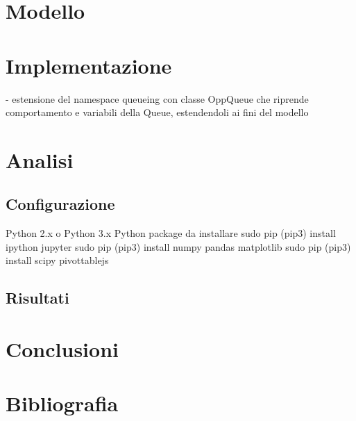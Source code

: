 \documentclass[a4paper,11pt]{article}
\begin{document}
\section{Modello}
\section{Implementazione}
- estensione del namespace queueing con classe OppQueue che riprende comportamento e variabili
della Queue, estendendoli ai fini del modello

\section{Analisi}
\subsection{Configurazione}
Python 2.x o Python 3.x
Python package da installare
sudo pip (pip3) install ipython jupyter
sudo pip (pip3) install numpy pandas matplotlib
sudo pip (pip3) install scipy pivottablejs

\subsection{Risultati}

\section{Conclusioni}

\section{Bibliografia}
\end{document}
